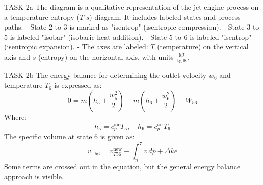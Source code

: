 TASK 2a  
The diagram is a qualitative representation of the jet engine process on a temperature-entropy (\( T \)-\( s \)) diagram. It includes labeled states and process paths:  
- State 2 to 3 is marked as "isentrop" (isentropic compression).  
- State 3 to 5 is labeled "isobar" (isobaric heat addition).  
- State 5 to 6 is labeled "isentrop" (isentropic expansion).  
- The axes are labeled: \( T \) (temperature) on the vertical axis and \( s \) (entropy) on the horizontal axis, with units \( \frac{\text{kJ}}{\text{kg·K}} \).  

TASK 2b  
The energy balance for determining the outlet velocity \( w_6 \) and temperature \( T_6 \) is expressed as:  
\[
0 = \dot{m} \left( h_5 + \frac{w_5^2}{2} \right) - \dot{m} \left( h_6 + \frac{w_6^2}{2} \right) - \dot{W}_{56}
\]  
Where:  
\[
h_5 = c_p^{\text{air}} T_5, \quad h_6 = c_p^{\text{air}} T_6
\]  
The specific volume at state 6 is given as:  
\[
v_{+56} = v_{T56}^{\text{new}} - \int_n^7 v \, dp + \Delta ke
\]  
Some terms are crossed out in the equation, but the general energy balance approach is visible.